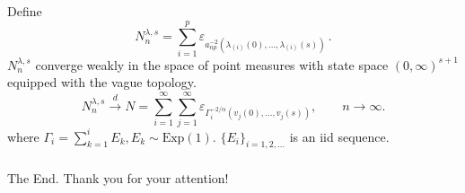 \documentclass{beamer}
\begin{document}
\begin{frame}
  \begin{small}
    \begin{theorem}
      Define
      \begin{equation*}
        N_n^{\lambda,s}=\sum_{i=1}^p \varepsilon_{a_{np}^{-2}(\lambda_{(i)}(0),\ldots,\lambda_{(i)}(s))} \,.
      \end{equation*}
      $N_n^{\lambda,s}$ converge weakly in the space of point measures
      with state space $(0,\infty)^{s+1}$ equipped with the vague topology.
      \begin{equation*}
        N_n^{\lambda,s} \overset{d}{\to} N= \sum_{i=1}^\infty
        \sum_{j=1}^{\infty} \varepsilon_{\Gamma_i^{-2/\alpha}
          (v_j(0),\ldots,v_j(s))}, \qquad n \to \infty.
      \end{equation*}
      where $\Gamma_i = \sum_{k=1}^i E_k, E_k \sim
      \text{Exp}(1)$. $\{E_i\}_{i=1,2,\dots}$ is an iid sequence. 
    \end{theorem}
  \end{small}
\end{frame}


\begin{frame}
  \frametitle{ }
  \begin{centering}
    \Large The End. Thank you for your attention!
  \end{centering}
 \end{frame}



\end{document}

